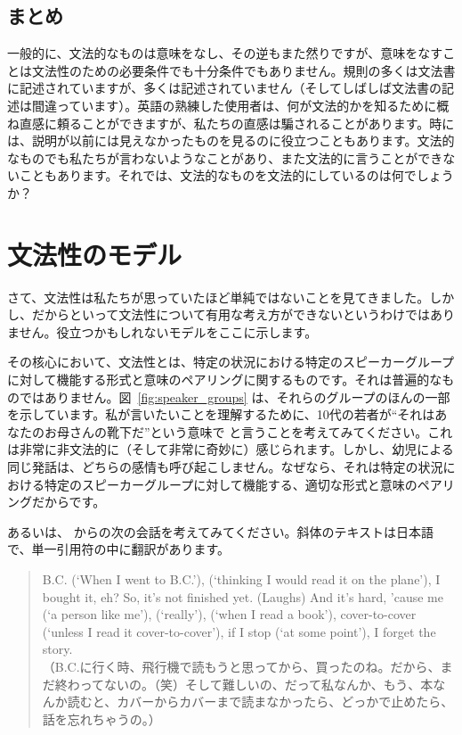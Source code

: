 \subsection{まとめ}

一般的に、文法的なものは意味をなし、その逆もまた然りですが、意味をなすことは文法性のための必要条件でも十分条件でもありません。規則の多くは文法書に記述されていますが、多くは記述されていません（そしてしばしば文法書の記述は間違っています）。英語の熟練した使用者は、何が文法的かを知るために概ね直感に頼ることができますが、私たちの直感は騙されることがあります。時には、説明が以前には見えなかったものを見るのに役立つこともあります。文法的なものでも私たちが言わないようなことがあり、また文法的に言うことができないこともあります。それでは、文法的なものを文法的にしているのは何でしょうか？

\section{文法性のモデル} \label{sec:gramm-model}

さて、文法性は私たちが思っていたほど単純ではないことを見てきました。しかし、だからといって文法性について有用な考え方ができないというわけではありません。役立つかもしれないモデルをここに示します。

その核心において、文法性とは、特定の状況における特定のスピーカーグループに対して機能する形式と意味のペアリングに関するものです。それは普遍的なものではありません。図~\ref{fig:speaker_groups} は、それらのグループのほんの一部を示しています。私が言いたいことを理解するために、10代の若者が\enquote{それはあなたのお母さんの靴下だ}という意味で  と言うことを考えてみてください。これは非常に非文法的に（そして非常に奇妙に）感じられます。しかし、幼児による同じ発話は、どちらの感情も呼び起こしません。なぜなら、それは特定の状況における特定のスピーカーグループに対して機能する、適切な形式と意味のペアリングだからです。

あるいは、\citet[179]{nishimura1995} からの次の会話を考えてみてください。斜体のテキストは日本語で、単一引用符の中に翻訳があります。

\begin{quote}
    B.C.  (`When I went to B.C.'),  (`thinking I would read it on the plane'), I bought it, eh? So, it's not finished yet. (Laughs) And it's hard, 'cause me (`a person like me'),  (`really'),  (`when I read a book'), cover-to-cover  (`unless I read it cover-to-cover'), if I stop (`at some point'), I forget the story.\\
    （B.C.に行く時、飛行機で読もうと思ってから、買ったのね。だから、まだ終わってないの。（笑）そして難しいの、だって私なんか、もう、本なんか読むと、カバーからカバーまで読まなかったら、どっかで止めたら、話を忘れちゃうの。）
\end{quote}

